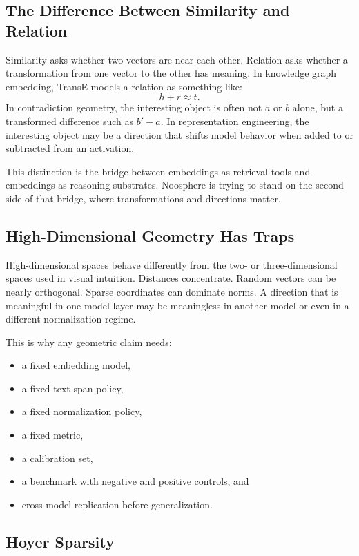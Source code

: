 \documentclass[11pt]{article}
\begin{document}
\subsection{The Difference Between Similarity and Relation}

Similarity asks whether two vectors are near each other. Relation asks whether a
transformation from one vector to the other has meaning. In knowledge graph
embedding, TransE models a relation as something like:
\[
h + r \approx t.
\]
In contradiction geometry, the interesting object is often not $a$ or $b$
alone, but a transformed difference such as $b' - a$. In representation
engineering, the interesting object may be a direction that shifts model
behavior when added to or subtracted from an activation.

This distinction is the bridge between embeddings as retrieval tools and
embeddings as reasoning substrates. Noosphere is trying to stand on the second
side of that bridge, where transformations and directions matter.

\subsection{High-Dimensional Geometry Has Traps}

High-dimensional spaces behave differently from the two- or three-dimensional
spaces used in visual intuition. Distances concentrate. Random vectors can be
nearly orthogonal. Sparse coordinates can dominate norms. A direction that is
meaningful in one model layer may be meaningless in another model or even in a
different normalization regime.

This is why any geometric claim needs:

\begin{itemize}
\item a fixed embedding model,
\item a fixed text span policy,
\item a fixed normalization policy,
\item a fixed metric,
\item a calibration set,
\item a benchmark with negative and positive controls, and
\item cross-model replication before generalization.
\end{itemize}

\subsection{Hoyer Sparsity}
\end{document}
